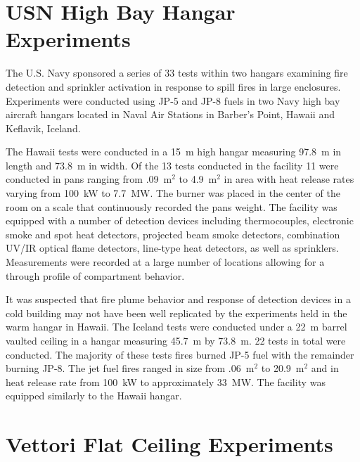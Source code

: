 \section{USN High Bay Hangar Experiments}

The U.S. Navy sponsored a series of 33 tests within two hangars examining fire detection and sprinkler activation in response to spill fires in large enclosures. Experiments were conducted using JP-5 and JP-8 fuels in two Navy high bay aircraft hangars located in Naval Air Stations in Barber's Point, Hawaii and Keflavik, Iceland.

The Hawaii tests were conducted in a 15~m high hangar measuring 97.8~m in length and 73.8~m in width. Of the 13 tests conducted in the facility 11 were conducted in pans ranging from .09~m$^2$ to 4.9~m$^2$ in area with heat release rates varying from 100~kW to 7.7~MW. The burner was placed in the center of the room on a scale that continuously recorded the pans weight. The facility was equipped with a number of detection devices including thermocouples, electronic smoke and spot heat detectors, projected beam smoke detectors, combination UV/IR optical flame detectors, line-type heat detectors, as well as sprinklers. Measurements were recorded at a large number of locations allowing for a through profile of compartment behavior.

It was suspected that fire plume behavior and response of detection devices in a cold building may not have been well replicated by the experiments held in the warm hangar in Hawaii. The Iceland tests were conducted under a 22~m barrel vaulted ceiling in a hangar measuring 45.7~m by 73.8~m. 22 tests in total were conducted. The majority of these tests fires burned JP-5 fuel with the remainder burning JP-8. The jet fuel fires ranged in size from .06~m$^2$ to 20.9~m$^2$ and in heat release rate from 100~kW to approximately 33~MW. The facility was equipped similarly to the Hawaii hangar.



\section{Vettori Flat Ceiling Experiments}

